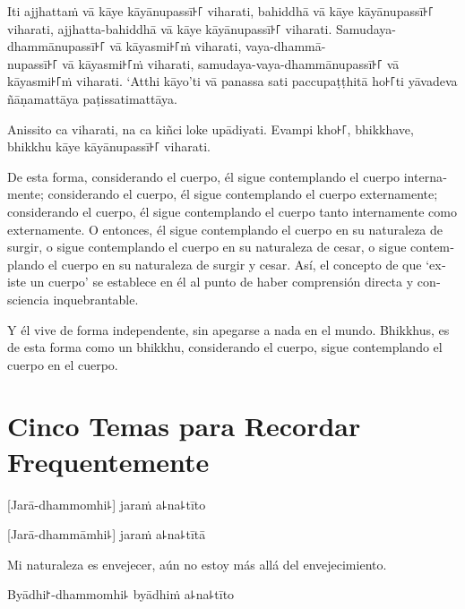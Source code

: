 Iti ajjhattaṁ vā kāye kāyānupassī꜔꜒ viharati, bahiddhā vā kāye kāyānupassī꜔꜒
viharati, ajjhatta-bahiddhā vā kāye kāyānupassī꜔꜒ viharati. Samudaya-dhammānupassī꜔꜒
vā kāyasmi꜔꜒ṁ viharati, vaya-dhammā-\\
nupassī꜔꜒ vā kāyasmi꜔꜒ṁ viharati, samudaya-vaya-dhammānupassī꜔꜒ vā kāyasmi꜔꜒ṁ viharati.
‘Atthi kāyo’ti vā panassa sati paccupaṭṭhitā ho꜔꜒ti yāvadeva ñāṇamattāya
paṭissatimattāya.

Anissito ca viharati, na ca kiñci loke upādiyati. Evampi kho꜔꜒,
bhikkhave, bhikkhu kāye kāyānupassī꜔꜒ viharati.

\begin{english}
  De esta forma, considerando el cuerpo, él sigue contemplando el cuerpo internamente;
  considerando el cuerpo, él sigue contemplando el cuerpo externamente;
  considerando el cuerpo, él sigue contemplando el cuerpo tanto internamente como externamente.
  O entonces, él sigue contemplando el cuerpo en su naturaleza de surgir,
  o sigue contemplando el cuerpo en su naturaleza de cesar, o sigue contemplando el cuerpo en su naturaleza de surgir y cesar. Así, el concepto de que ‘existe
  un cuerpo’ se establece en él al punto de haber  comprensión directa y consciencia inquebrantable.

  \bigskip

  Y él vive de forma independente, sin apegarse a nada en el mundo. Bhikkhus,
  es de esta forma como un bhikkhu, considerando el cuerpo, sigue contemplando el cuerpo en el cuerpo.
\end{english}

\chapter[Cinco Temas]{Cinco Temas para Recordar Frequentemente}


\begin{leader}
\end{leader}

%
[Jarā-dhammomhi꜕] jaraṁ a꜕na꜕tīto

%
[Jarā-dhammāmhi꜕] jaraṁ a꜕na꜕tītā

\begin{english}
  Mi naturaleza es envejecer, aún no estoy más allá del envejecimiento.
\end{english}

%
Byādhi꜓-dhammomhi꜕ byādhiṁ a꜕na꜕tīto

